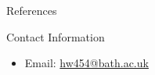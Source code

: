 \documentclass[final]{beamer}
\theoremstyle{plain}
\theoremstyle{definition}
\theoremstyle{remark}
\newlength{\threecolwid}
\begin{document}
\begin{frame}[t]
\begin{columns}[t]
\begin{column}{\threecolwid}
\begin{alertblock}{References}

\nocite{*} %
\tiny{\scalebox {.2}{} 
 \vspace{0.75in}}

\end{alertblock}


\begin{alertblock}{Contact Information} \small

\begin{itemize}
\item Email: \href{mailto:hw454@bath.ac.uk}{hw454@bath.ac.uk}

\end{itemize}

\end{alertblock}







\end{column} %

\end{columns} %

\end{frame} %
\end{document}
